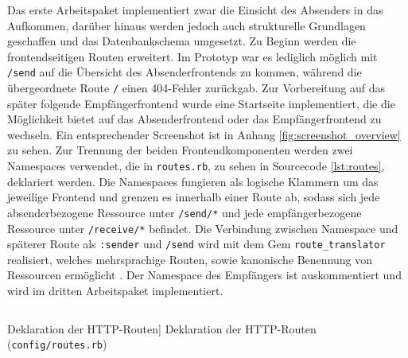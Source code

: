 Das erste Arbeitspaket implementiert zwar die Einsicht des Absenders in das Aufkommen, darüber hinaus werden jedoch auch strukturelle Grundlagen geschaffen und das Datenbankschema umgesetzt. Zu Beginn werden die frontendseitigen Routen erweitert. Im Prototyp war es lediglich möglich mit \texttt{/send} auf die Übersicht des Absenderfrontends zu kommen, während die übergeordnete Route \texttt{/} einen 404-Fehler zurückgab. Zur Vorbereitung auf das später folgende Empfängerfrontend wurde eine Startseite implementiert, die die Möglichkeit bietet auf das Absenderfrontend oder das Empfängerfrontend zu wechseln. Ein entsprechender Screenshot ist in Anhang \ref{fig:screenshot_overview} zu sehen. Zur Trennung der beiden Frontendkomponenten werden zwei Namespaces verwendet, die in \texttt{routes.rb}, zu sehen in Sourcecode \ref{lst:routes}, deklariert werden. Die Namespaces fungieren als logische Klammern um das jeweilige Frontend und grenzen es innerhalb einer Route ab, sodass sich jede absenderbezogene Ressource unter \texttt{/send/*} und jede empfängerbezogene Ressource unter \texttt{/receive/*} befindet. Die Verbindung zwischen Namespace und späterer Route als \texttt{:sender} und \texttt{/send} wird mit dem Gem \texttt{route\_translator} realisiert, welches mehrsprachige Routen, sowie kanonische Benennung von Ressourcen ermöglicht \citep{LLuelles2022}. Der Namespace des Empfängers ist auskommentiert und wird im dritten Arbeitspaket implementiert.

\begin{listing}[!ht]
\inputminted[linenos]{ruby}{Listings/Pkg1/routes.rb}

\caption
    [Deklaration der HTTP-Routen]
    {Deklaration der HTTP-Routen (\texttt{config/routes.rb})}

\label{lst:routes}
\end{listing}

